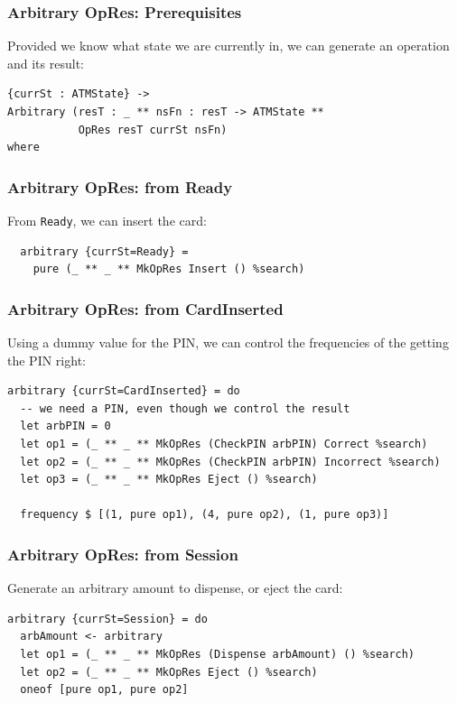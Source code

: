 \documentclass[compress,handout]{beamer}
\begin{document}
\begin{frame}[fragile]
  \frametitle{Arbitrary OpRes: Prerequisites}

  Provided we know what state we are currently in, we can generate an operation
  and its result:

  \begin{verbatim}
{currSt : ATMState} ->
Arbitrary (resT : _ ** nsFn : resT -> ATMState **
           OpRes resT currSt nsFn)
where
          \end{verbatim}

\end{frame}


\begin{frame}[fragile]
  \frametitle{Arbitrary OpRes: from Ready}

  From \texttt{Ready}, we can insert the card:

  \begin{verbatim}
  arbitrary {currSt=Ready} =
    pure (_ ** _ ** MkOpRes Insert () %search)
  \end{verbatim}

\end{frame}


\begin{frame}[fragile]
  \frametitle{Arbitrary OpRes: from CardInserted}

  Using a dummy value for the PIN, we can control the frequencies of the getting
  the PIN right:

  \begin{verbatim}
arbitrary {currSt=CardInserted} = do
  -- we need a PIN, even though we control the result
  let arbPIN = 0
  let op1 = (_ ** _ ** MkOpRes (CheckPIN arbPIN) Correct %search)
  let op2 = (_ ** _ ** MkOpRes (CheckPIN arbPIN) Incorrect %search)
  let op3 = (_ ** _ ** MkOpRes Eject () %search)

  frequency $ [(1, pure op1), (4, pure op2), (1, pure op3)]
  \end{verbatim}

\end{frame}


\begin{frame}[fragile]
  \frametitle{Arbitrary OpRes: from Session}

  Generate an arbitrary amount to dispense, or eject the card:

  \begin{verbatim}
arbitrary {currSt=Session} = do
  arbAmount <- arbitrary
  let op1 = (_ ** _ ** MkOpRes (Dispense arbAmount) () %search)
  let op2 = (_ ** _ ** MkOpRes Eject () %search)
  oneof [pure op1, pure op2]
  \end{verbatim}

\end{frame}
\end{document}

